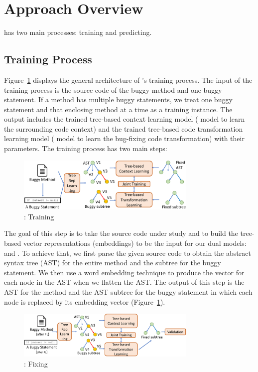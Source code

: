 \section{Approach Overview}
\label{overview:sec}

{\tool} has two main processes: training and predicting.

\subsection{Training Process}

Figure~\ref{overview-training} displays the general architecture of
{\tool}'s training process. The input of the training process is the
source code of the buggy method and one buggy statement. If a method
has multiple buggy statements, we treat one buggy statement and that
enclosing method at a time as a training instance. The output includes
the trained tree-based context learning model ( model to
learn the surrounding code context) and the trained tree-based code
transformation learning model ( model to learn the
bug-fixing code transformation) with their parameters. The training
process has two main steps:

\begin{figure}[t]
	\centering
	\includegraphics[width=3.4in]{graphs/overview-training.png}
	\caption{{\tool}: Training}
	\label{overview-training}
\end{figure}

 The goal of this
step is to take the source code under study and to build the
tree-based vector representations (embeddings) to be the input for our
dual models:  and . To achieve that, we first
parse the given source code to obtain the abstract syntax tree (AST)
for the entire method and the subtree for the buggy statement.  We
then use a word embedding technique to produce the vector for each
node in the AST when we flatten the AST. The output of this step is
the AST for the method and the AST subtree for the buggy statement in
which each node is replaced by its embedding vector
(Figure~\ref{overview-training}).



\begin{figure}[t]
	\centering
	\includegraphics[width=3.4in]{graphs/overview-predict.png}
	\caption{{\tool}: Fixing}
	\label{overview-fixing}
\end{figure}

